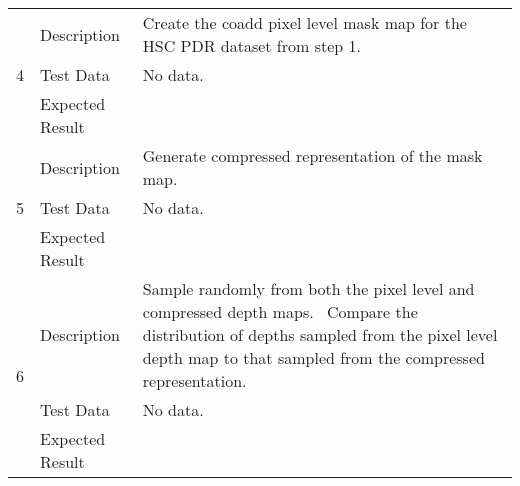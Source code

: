 \begin{longtable}[]{p{1.3cm}p{2cm}p{13cm}}
            \multirow{3}{*}{ 4 } & Description &
            \begin{minipage}[t]{13cm}{\footnotesize
            Create the coadd pixel level mask map for the HSC PDR dataset from step
1.

            \vspace{\dp0}
            } \end{minipage} \\ \cline{2-3}
            & Test Data &
            \begin{minipage}[t]{13cm}{\footnotesize
                No data.
                \vspace{\dp0}
            } \end{minipage} \\ \cline{2-3}
            & Expected Result &
        \\ \midrule

            \multirow{3}{*}{ 5 } & Description &
            \begin{minipage}[t]{13cm}{\footnotesize
            Generate compressed representation of the mask map.

            \vspace{\dp0}
            } \end{minipage} \\ \cline{2-3}
            & Test Data &
            \begin{minipage}[t]{13cm}{\footnotesize
                No data.
                \vspace{\dp0}
            } \end{minipage} \\ \cline{2-3}
            & Expected Result &
        \\ \midrule

            \multirow{3}{*}{ 6 } & Description &
            \begin{minipage}[t]{13cm}{\footnotesize
            Sample randomly from both the pixel level and compressed depth maps.
~Compare the distribution of depths sampled from the pixel level depth
map to that sampled from the compressed representation.

            \vspace{\dp0}
            } \end{minipage} \\ \cline{2-3}
            & Test Data &
            \begin{minipage}[t]{13cm}{\footnotesize
                No data.
                \vspace{\dp0}
            } \end{minipage} \\ \cline{2-3}
            & Expected Result &
        \\ \midrule


\end{longtable}
